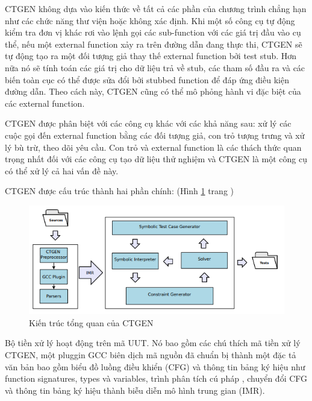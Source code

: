 \documentclass[12pt,a4paper]{article}
\begin{document}
\indent CTGEN không dựa vào kiến thức về tất cả các phần của chương trình chẳng hạn như các chức năng thư viện hoặc không xác định. Khi một số công cụ tự động kiểm tra đơn vị khác rơi vào lệnh gọi các sub-function với các giá trị đầu vào cụ thể, nếu một external function xảy ra trên đường dẫn đang thực thi, CTGEN sẽ tự động tạo ra một đối tượng giả thay thế external function bởi test stub. Hơn nữa nó sẽ tính toán các giá trị cho dữ liệu trả về stub, các tham số đầu ra và các biến toàn cục có thể được sửa đổi bởi stubbed function để đáp ứng điều kiện đường dẫn. Theo cách này, CTGEN cũng có thể mô phỏng hành vi đặc biệt của các external function.

\indent CTGEN được phân biệt với các công cụ khác với các khả năng sau: xử lý các cuộc gọi đến external function bằng các đối tượng giả, con trỏ tượng trưng và xử lý bù trừ, theo dõi yêu cầu. Con trỏ và external function là các thách thức quan trọng nhất đối với các công cụ tạo dữ liệu thử nghiệm và CTGEN là một công cụ có thể xử lý cả hai vấn đề này.

\indent CTGEN được cấu trúc thành hai phần chính: (Hình \ref{refhinh5} trang \pageref{refhinh5})

\begin{figure}[ht]
\begin{center}
\includegraphics[scale=0.8]{hinhanh/hinh5}
\end{center}
\caption{Kiến trúc tổng quan của CTGEN}
\label{refhinh5}
\end{figure}

\indent Bộ tiền xử lý hoạt động trên mã UUT. Nó bao gồm các chú thích mã tiền xử lý CTGEN, một pluggin GCC biên dịch mã nguồn đã chuẩn bị thành một đặc tả văn bản bao gồm biểu đồ luồng điều khiển (CFG) và thông tin bảng ký hiệu như function signatures, types và variables, trình phân tích cú pháp , chuyển đổi CFG và thông tin bảng ký hiệu thành biễu diễn mô hình trung gian (IMR).
\end{document}
